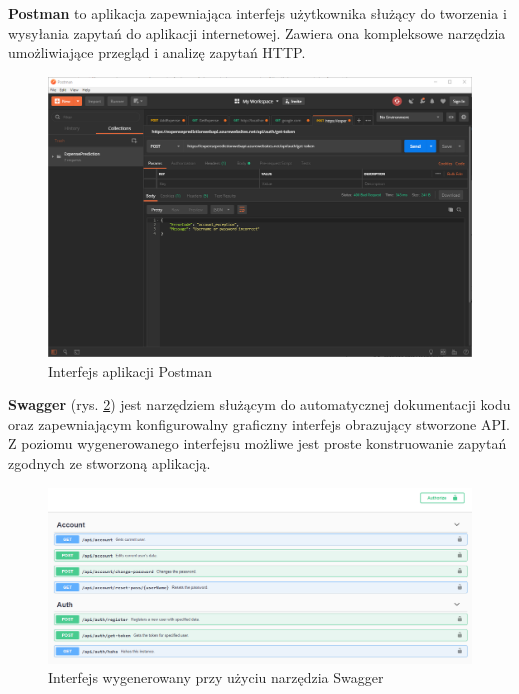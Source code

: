 \textbf{Postman} to aplikacja zapewniająca interfejs użytkownika służący do tworzenia i wysyłania zapytań do aplikacji internetowej. Zawiera ona kompleksowe narzędzia umożliwiające przegląd i analizę zapytań HTTP. \cite{postman}
\begin{figure}[!ht]
	\begin{center}
		\includegraphics[width=6in]{img/aplikacje/postman_interfejs.png}
		\caption{Interfejs aplikacji Postman}
		\label{postman_interfejs}
	\end{center}
\end{figure}

\textbf{Swagger} (rys. \ref{swagger_interfejs}) jest narzędziem służącym do automatycznej dokumentacji kodu oraz zapewniającym konfigurowalny graficzny interfejs obrazujący stworzone API. Z poziomu wygenerowanego interfejsu możliwe jest proste konstruowanie zapytań zgodnych ze stworzoną aplikacją.\cite{swagger}
\begin{figure}[!ht]
	\begin{center}
		\includegraphics[width=6in]{img/aplikacje/swagger_interfejs.png}
		\caption{Interfejs wygenerowany przy użyciu narzędzia Swagger}
		\label{swagger_interfejs}
	\end{center}
\end{figure}

